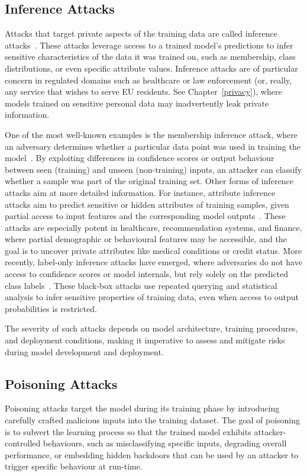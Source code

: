 \subsection{Inference Attacks}
\label{subsec:inference_attacks}
Attacks that target private aspects of the training data are called inference attacks~\cite{li2021membership,jia2018attriguard,shokri2017membership}.
These attacks leverage access to a trained model’s predictions to infer sensitive characteristics of the data it was trained on, such as membership, class distributions, or even specific attribute values.
Inference attacks are of particular concern in regulated domains such as healthcare or law enforcement (or, really, any service that wishes to serve EU residents. See Chapter~\ref{privacy}), where models trained on sensitive personal data may inadvertently leak private information. 


One of the most well-known examples is the membership inference attack, where an adversary determines whether a particular data point was used in training the model~\cite{shokri2017membership,li2021membership}. 
By exploiting differences in confidence scores or output behaviour between seen (training) and unseen (non-training) inputs, an attacker can classify whether a sample was part of the original training set.
Other forms of inference attacks aim at more detailed information. 
For instance, attribute inference attacks aim to predict sensitive or hidden attributes of training samples, given partial access to input features and the corresponding model outputs~\cite{fredrikson2015model,ateniese2015hacking}.
These attacks are especially potent in healthcare, recommendation systems, and finance, where partial demographic or behavioural features may be accessible, and the goal is to uncover private attributes like medical conditions or credit status.
More recently, label-only inference attacks have emerged, where adversaries do not have access to confidence scores or model internals, but rely solely on the predicted class labels~\cite{choquette2021label}. 
These black-box attacks use repeated querying and statistical analysis to infer sensitive properties of training data, even when access to output probabilities is restricted.

The severity of such attacks depends on model architecture, training procedures, and deployment conditions, making it imperative to assess and mitigate risks during model development and deployment. 


\subsection{Poisoning Attacks}
\label{subsec:poisoning_attacks}
Poisoning attacks target the model during its training phase by introducing carefully crafted malicious inputs into the training dataset. 
The goal of poisoning is to subvert the learning process so that the trained model exhibits attacker-controlled behaviours, such as misclassifying specific inputs, degrading overall performance, or embedding hidden backdoors that can be used by an attacker to trigger specific behaviour at run-time.

